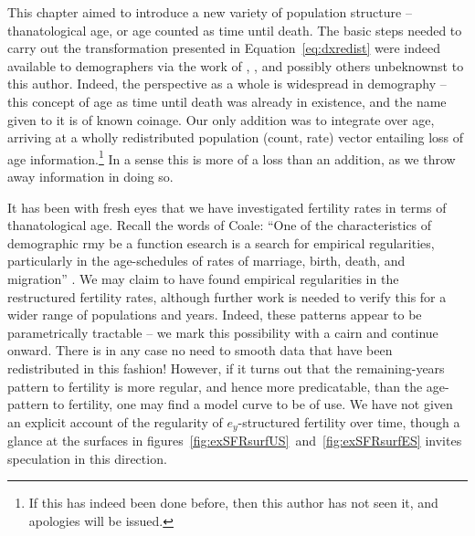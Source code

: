 \FloatBarrier
\label{sec:esfrreflections}
This chapter aimed to introduce a new variety of population structure --
thanatological age, or age counted as time until death. The basic steps needed
to carry out the transformation presented in Equation~\eqref{eq:dxredist} were
indeed available to demographers via the work of
\citet{miller2001increasing}, \citet{lee2002approach}, \citet{vaupel2009life}
and possibly others unbeknownst to this author. Indeed, the perspective as a
whole is widespread in demography -- this concept of age as time until death
was already in existence, and the name given to it is of known coinage. Our only
addition was to integrate over age, arriving at a wholly 
redistributed population (count, rate) vector entailing loss of age
information.\footnote{If this has indeed been done before, then this author has
not seen it, and apologies will be issued.} In a sense this is more of a loss
than an addition, as we throw away information in doing so. 

It has been with fresh eyes that we have investigated fertility rates in terms
of thanatological age. Recall the words of Coale:
``One of the characteristics of demographic rmy be
a function esearch is a search for empirical regularities, particularly in the
age-schedules of rates of marriage, birth, death, and
migration'' \citep{coale1996development}. We may claim to have found
empirical regularities in the restructured fertility rates, although further
work is needed to verify this for a wider range of populations and years.
Indeed, these patterns appear to be parametrically tractable -- we mark this 
possibility with a cairn and continue onward. There is in any case no need to smooth data that
have been redistributed in this fashion! However, if it turns out that the
remaining-years pattern to fertility is more regular, and hence more
predicatable, than the age-pattern to fertility, one may find a model curve to
be of use. We have not given an explicit account of the regularity of
$e_y$-structured fertility over time, though a glance at the surfaces in
figures~\ref{fig:exSFRsurfUS}~and~\ref{fig:exSFRsurfES} invites speculation in
this direction.
 
